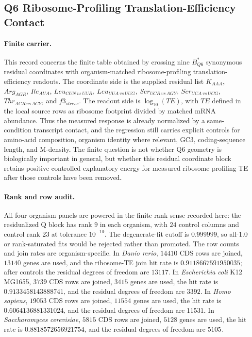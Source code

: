 \subsection{Q6 Ribosome-Profiling Translation-Efficiency Contact}
\label{subsec:q6-ribosome-te-survival-with-mrna-control-cross-layer}

\paragraph{Finite carrier.}
This record concerns the finite table obtained by crossing nine $B^*_{Q6}$ synonymous residual coordinates with organism-matched ribosome-profiling translation-efficiency readouts.  The coordinate side is the supplied residual list
$K_{AAA}$, $Arg_{AGR}$, $Ile_{AUA}$, $Leu_{CUN\,vs\,UUR}$, $Leu_{UUA\,vs\,UUG}$, $Ser_{UCR\,vs\,AGY}$, $Ser_{UCA\,vs\,UCG}$, $Thr_{ACR\,vs\,ACY}$, and $f3_{stress}$.
The readout side is $\log_{10}(TE)$, with $TE$ defined in the local source rows as ribosome footprint divided by matched mRNA abundance.  Thus the measured response is already normalized by a same-condition transcript contact, and the regression still carries explicit controls for amino-acid composition, organism identity where relevant, GC3, coding-sequence length, and M-density.  The finite question is not whether Q6 geometry is biologically important in general, but whether this residual coordinate block retains positive controlled explanatory energy for measured ribosome-profiling TE after those controls have been removed.

\paragraph{Rank and row audit.}
All four organism panels are powered in the finite-rank sense recorded here: the residualized Q block has rank $9$ in each organism, with $24$ control columns and control rank $23$ at tolerance $10^{-10}$.  The degenerate-fit cutoff is $0.999999$, so all-1.0 or rank-saturated fits would be rejected rather than promoted.  The row counts and join rates are organism-specific.  In \emph{Danio rerio}, $14410$ CDS rows are joined, $13140$ genes are used, and the ribosome-TE join hit rate is $0.9118667591950035$; after controls the residual degrees of freedom are $13117$.  In \emph{Escherichia coli} K12 MG1655, $3739$ CDS rows are joined, $3415$ genes are used, the hit rate is $0.9133458143888741$, and the residual degrees of freedom are $3392$.  In \emph{Homo sapiens}, $19053$ CDS rows are joined, $11554$ genes are used, the hit rate is $0.6064136881331024$, and the residual degrees of freedom are $11531$.  In \emph{Saccharomyces cerevisiae}, $5815$ CDS rows are joined, $5128$ genes are used, the hit rate is $0.8818572656921754$, and the residual degrees of freedom are $5105$.

